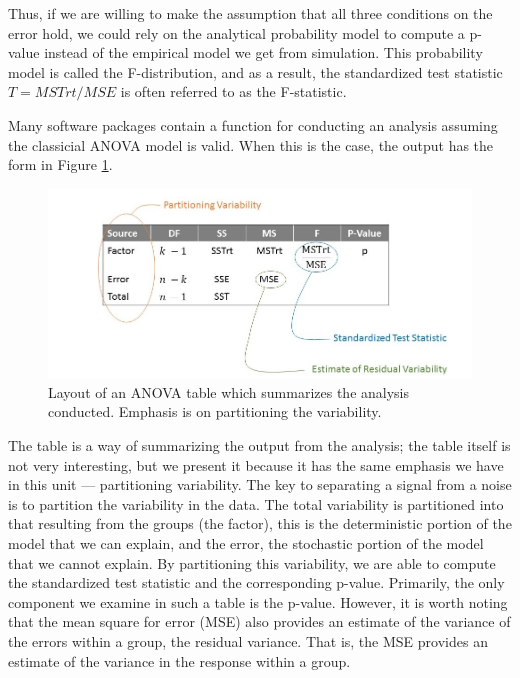 \documentclass[]{book}
\theoremstyle{definition}
\theoremstyle{definition}
\theoremstyle{remark}
\begin{document}
Thus, if we are willing to make the assumption that all three conditions
on the error hold, we could rely on the analytical probability model to
compute a p-value instead of the empirical model we get from simulation.
This probability model is called the F-distribution, and as a result,
the standardized test statistic \(T = MSTrt/MSE\) is often referred to
as the F-statistic.

Many software packages contain a function for conducting an analysis
assuming the classicial ANOVA model is valid. When this is the case, the
output has the form in Figure \ref{fig:anovaclassical-table}.

\begin{figure}

{\centering \includegraphics[width=0.8\linewidth]{./images/ANOVAclassical-Table} 

}

\caption{Layout of an ANOVA table which summarizes the analysis conducted.  Emphasis is on partitioning the variability.}\label{fig:anovaclassical-table}
\end{figure}

The table is a way of summarizing the output from the analysis; the
table itself is not very interesting, but we present it because it has
the same emphasis we have in this unit --- partitioning variability. The
key to separating a signal from a noise is to partition the variability
in the data. The total variability is partitioned into that resulting
from the groups (the factor), this is the deterministic portion of the
model that we can explain, and the error, the stochastic portion of the
model that we cannot explain. By partitioning this variability, we are
able to compute the standardized test statistic and the corresponding
p-value. Primarily, the only component we examine in such a table is the
p-value. However, it is worth noting that the mean square for error
(MSE) also provides an estimate of the variance of the errors within a
group, the residual variance. That is, the MSE provides an estimate of
the variance in the response within a group.
\end{document}
